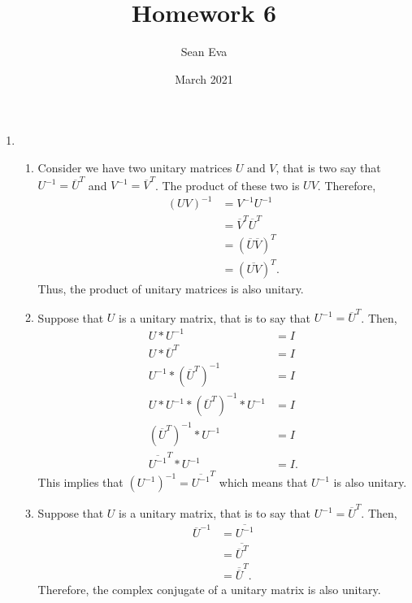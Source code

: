 \documentclass{article}
\title{Homework 6}
\author{Sean Eva}
\date{March 2021}
\begin{document}
\maketitle

\begin{enumerate}
    \item 
    
    \begin{enumerate}
        \item 
        
        Consider we have two unitary matrices $U \text{ and } V$, that is two say that $U^{-1}=\overline{U}^T$ and $V^{-1}=\overline{V}^T$. The product of these two is $UV$. Therefore,
        \begin{align*}
            (UV)^{-1} &= V^{-1}U^{-1}\\
            &= \overline{V}^T\overline{U}^T\\
            &= (\overline{U}\overline{V})^T\\
            &= (\overline{UV})^T.
        \end{align*}Thus, the product of unitary matrices is also unitary.
        
        \item
        
        Suppose that $U$ is a unitary matrix, that is to say that $U^{-1}=\overline{U}^T$. Then,
        \begin{align*}
            U*U^{-1}&=I\\
            U*\overline{U}^T&=I\\
            U^{-1}*(\overline{U}^T)^{-1}&=I\\
            U*U^{-1}*(\overline{U}^T)^{-1}*U^{-1}&=I\\
            (\overline{U}^T)^{-1}*U^{-1}&=I\\
            \overline{U^{-1}}^T*U^{-1}&=I.
        \end{align*}This implies that $(U^{-1})^{-1}=\overline{U^{-1}}^T$ which means that $U^{-1}$ is also unitary.
        
        \item
        
        Suppose that $U$ is a unitary matrix, that is to say that $U^{-1}=\overline{U}^T$. Then,
        \begin{align*}
            \overline{U}^{-1}&= \overline{U^{-1}}\\
            &= \overline{\overline{U}^T}\\
            &= \overline{\overline{U}}^T.
        \end{align*} Therefore, the complex conjugate of a unitary matrix is also unitary.
        

\end{enumerate}
\end{enumerate}
\end{document}

